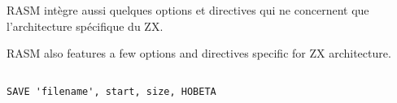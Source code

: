 \section{}\label{PZX}

\begin{xfr}
RASM intègre aussi quelques options et directives qui ne concernent que l'architecture spécifique du ZX.
\end{xfr}

\begin{xen}
RASM also features a few options and directives specific for ZX architecture.
\end{xen}


\subsection{}\label{HOBETA}

\begin{verbatim}
SAVE 'filename', start, size, HOBETA
\end{verbatim}

